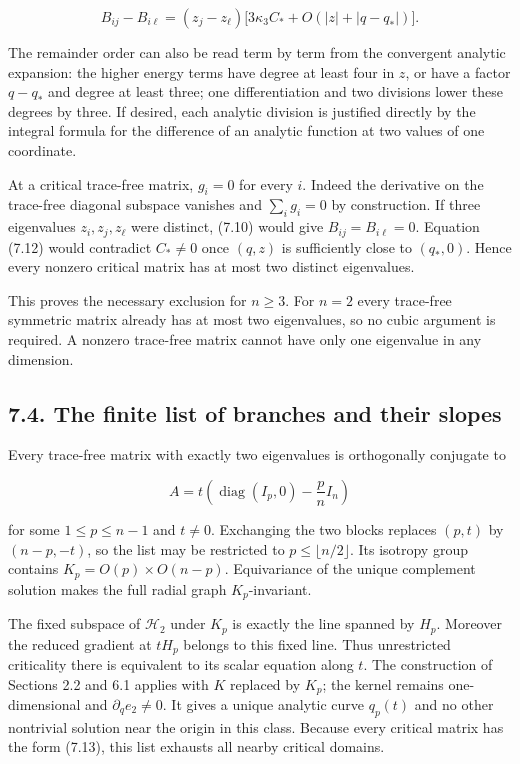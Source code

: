 \documentclass[11pt]{article}
\begin{document}
\[
B_{ij}-B_{i\ell}=(z_j-z_\ell)
\big[3\kappa_3C_*+O(|z|+|q-q_*|)\big].
\tag{7.12}
\]

The remainder order can also be read term by term from the convergent
analytic expansion: the higher energy terms have degree at least four in
\(z\), or have a factor \(q-q_*\) and degree at least three; one
differentiation and two divisions lower these degrees by three. If
desired, each analytic division is justified directly by the integral
formula for the difference of an analytic function at two values of one
coordinate.

At a critical trace-free matrix, \(g_i=0\) for every \(i\). Indeed the
derivative on the trace-free diagonal subspace vanishes and
\(\sum_i g_i=0\) by construction. If three eigenvalues
\(z_i,z_j,z_\ell\) were distinct, (7.10) would give
\(B_{ij}=B_{i\ell}=0\). Equation (7.12) would contradict \(C_*\ne0\)
once \((q,z)\) is sufficiently close to \((q_*,0)\). Hence every nonzero
critical matrix has at most two distinct eigenvalues.

This proves the necessary exclusion for \(n\ge3\). For \(n=2\) every
trace-free symmetric matrix already has at most two eigenvalues, so no
cubic argument is required. A nonzero trace-free matrix cannot have only
one eigenvalue in any dimension.

\subsection{7.4. The finite list of branches and their
slopes}\label{the-finite-list-of-branches-and-their-slopes}

Every trace-free matrix with exactly two eigenvalues is orthogonally
conjugate to

\[
A=t\left(\operatorname{diag}(I_p,0)-\frac pn I_n\right)
\tag{7.13}
\]

for some \(1\le p\le n-1\) and \(t\ne0\). Exchanging the two blocks
replaces \((p,t)\) by \((n-p,-t)\), so the list may be restricted to
\(p\le\lfloor n/2\rfloor\). Its isotropy group contains
\(K_p=O(p)\times O(n-p)\). Equivariance of the unique complement
solution makes the full radial graph \(K_p\)-invariant.

The fixed subspace of \(\mathcal H_2\) under \(K_p\) is exactly the line
spanned by \(H_p\). Moreover the reduced gradient at \(tH_p\) belongs to
this fixed line. Thus unrestricted criticality there is equivalent to
its scalar equation along \(t\). The construction of Sections 2.2 and
6.1 applies with \(K\) replaced by \(K_p\); the kernel remains
one-dimensional and \(\partial_q e_2\ne0\). It gives a unique analytic
curve \(q_p(t)\) and no other nontrivial solution near the origin in
this class. Because every critical matrix has the form (7.13), this list
exhausts all nearby critical domains.
\end{document}
